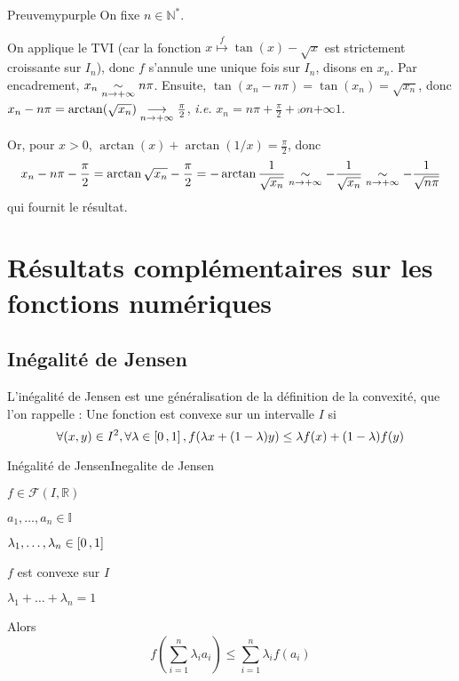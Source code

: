     \begin{demo}{Preuve}{mypurple}
        On fixe $n \in \mathbb{N}^*$.

        On applique le TVI (car la fonction $x \overset{f}{\longmapsto} \tan(x) - \sqrt{x}$ est strictement croissante sur $I_n$), donc $f$ s’annule une unique fois sur $I_n$, disons en $x_n$. Par encadrement, $x_n \underset{n \rightarrow +\infty}{\sim} n \pi$. Ensuite, $\tan(x_n - n\pi) = \tan(x_n) = \sqrt{x_n}$, donc $x_n - n \pi = \arctan(\sqrt{x_n}) \underset{n \rightarrow +\infty}{\longrightarrow} \frac{\pi}{2}$, \textit{i.e.} $x_n = n \pi + \frac{\pi}{2} + \comp{o}{n}{+\infty}{1}$. 
        
        Or, pour $x > 0$, $\arctan(x) + \arctan(1/x) = \frac{\pi}{2}$, donc 
        \[ x_n - n\pi -\frac{\pi}{2} = \arctan\sqrt{x_n} - \frac{\pi}{2} = - \arctan\frac{1}{\sqrt{x_n}} \underset{n \rightarrow +\infty}{\sim} -\frac{1}{\sqrt{x_n}} \underset{n \rightarrow +\infty}{\sim} - \frac{1}{\sqrt{n \pi}} \]   
        qui fournit le résultat.
    \end{demo}

\newpage

\section[Résultats complémentaires]{Résultats complémentaires sur les fonctions numériques}

    \subsection{Inégalité de Jensen}

    L’inégalité de Jensen est une généralisation de la définition de la convexité, que l’on rappelle : Une fonction est convexe sur un intervalle $I$ si \[ \forall (x,y) \in I^2, \forall \lambda \in \left[ 0 \, , 1 \right], f(\lambda x + (1-\lambda)y) \leq \lambda f(x) + (1-\lambda) f(y) \] 

    \begin{theo}{Inégalité de Jensen}{Inegalite de Jensen}
        \begin{soient}
            \item $f \in \mathcal{F}(I,\mathbb{R})$
            \item $a_1,\ldots,a_n \in \mathbb{I}$
            \item $\lambda_1,\ldots,\lambda_n \in \left[ 0 \, , 1 \right]$
        \end{soient}
        \begin{suppose}
            \item $f$ est convexe sur $I$
            \item $\lambda_1 + \ldots + \lambda_n = 1$
        \end{suppose}

        Alors \[ f\left(\sum\limits_{i=1}^n \lambda_i a_i\right) \leq \sum\limits_{i=1}^n \lambda_i f(a_i) \]
    \end{theo}

